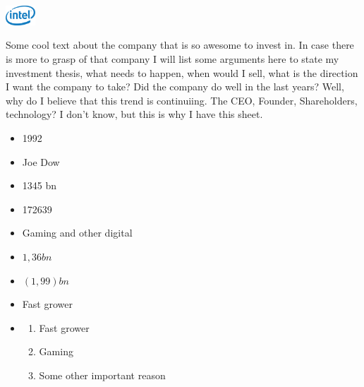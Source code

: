 \documentclass[11pt]{scrartcl}
\begin{document}



\begin{minipage}{\textwidth}
    \includegraphics[width=3em]{company_logo.png}
\end{minipage}

\begin{minipage}{0,75\textwidth}
    Some cool text about the company that is so awesome to invest in.
    In case there is more to grasp of that company I will list
    some arguments here to state my investment thesis, what needs
    to happen, when would I sell, what is the direction I want the
    company to take?
    Did the company do well in the last years? Well, why do I believe
    that this trend is continuiing. The CEO, Founder, Shareholders,
    technology? I don't know, but this is why I have this sheet.
\end{minipage}

\begin{minipage}[r]{0,25\textwidth}
    \begin{itemize}
        \item [\faAsterisk] 1992
        \item [\faMale] Joe Dow
        \item [\faEuro] \num{1345} bn
        \item [\faUsers] \num{172639}
        \item [\faIndustry] Gaming and other digital
        \item [\faBook] \faEuro $1,36 bn$
        \item [\reflectbox{\rotatebox[origin=c]{270}{\faLevelDown}}] \faEuro $(1,99) bn$
        \item [\faFolderOpen]Fast grower
        \item [\faQuestion]
        \begin{enumerate}
            \item Fast grower
            \item Gaming
            \item Some other important reason
        \end{enumerate}

    \end{itemize}
\end{minipage}
\end{document}
